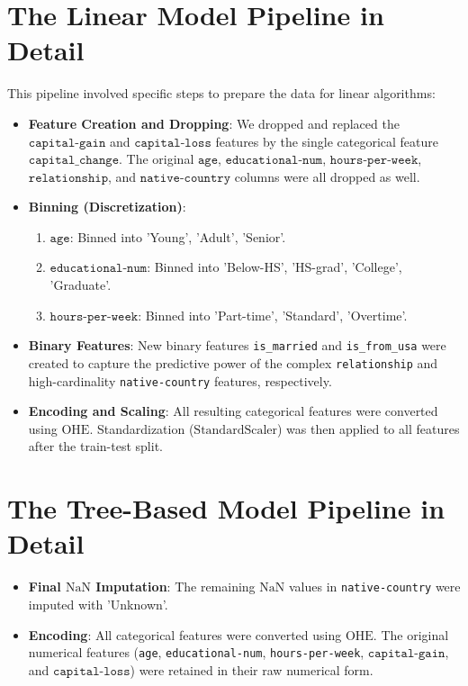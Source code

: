 \section{The Linear Model Pipeline in Detail}
This pipeline involved specific steps to prepare the data for linear algorithms:
\begin{itemize}
    \item \textbf{Feature Creation and Dropping}: We dropped and replaced the $\texttt{capital-gain}$ and $\texttt{capital-loss}$ features by the single categorical feature $\texttt{capital\_change}$. The original $\texttt{age}$, $\texttt{educational-num}$, $\texttt{hours-per-week}$, $\texttt{relationship}$, and $\texttt{native-country}$ columns were all dropped as well.
    \item \textbf{Binning (Discretization)}:
    \begin{enumerate}
        \item $\texttt{age}$: Binned into 'Young', 'Adult', 'Senior'.
        \item $\texttt{educational-num}$: Binned into 'Below-HS', 'HS-grad', 'College', 'Graduate'.
        \item $\texttt{hours-per-week}$: Binned into 'Part-time', 'Standard', 'Overtime'.
    \end{enumerate}
    \item \textbf{Binary Features}: New binary features \texttt{is\_married} and \texttt{is\_from\_usa} were created to capture the predictive power of the complex \texttt{relationship} and high-cardinality \texttt{native-country} features, respectively.
    \item \textbf{Encoding and Scaling}: All resulting categorical features were converted using $\text{OHE}$. Standardization ($\text{StandardScaler}$) was then applied to all features after the train-test split.
\end{itemize}

\vspace{1 \baselineskip}
\section{The Tree-Based Model Pipeline in Detail}
\begin{itemize}
    \item \textbf{Final $\text{NaN}$ Imputation}: The remaining $\text{NaN}$ values in \texttt{native-country} were imputed with 'Unknown'.
    \item \textbf{Encoding}: All categorical features were converted using $\text{OHE}$. The original numerical features (\texttt{age}, \texttt{educational-num}, \texttt{hours-per-week}, $\texttt{capital-gain}$, and $\texttt{capital-loss}$) were retained in their raw numerical form.
\end{itemize}

\vspace{2 \baselineskip}